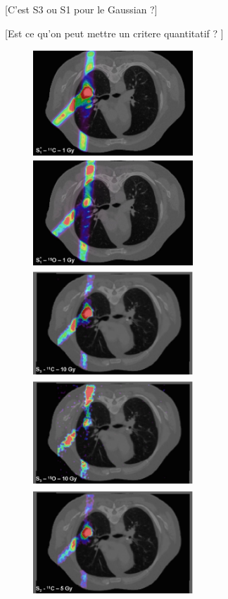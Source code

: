 \documentclass[11pt]{iopart}
\newcommand{\dsnote}[1]{{\color{green}[#1]}}
\begin{document}
\dsnote{C'est S3 ou S1 pour le Gaussian ?}

\dsnote{Est ce qu'on peut mettre un critere quantitatif ? }


\begin{figure}[!h]
  \centering
  \includegraphics[width=6cm,height=40mm]{figures/gaussPET_C11_v1.jpg}
  \includegraphics[width=6cm,height=40mm]{figures/gaussPET_O15_v1.jpg}
  \includegraphics[width=6cm,height=40mm]{figures/C11_10Gy_v1.jpg}
  \includegraphics[width=6cm,height=40mm]{figures/O15_10Gy_v1.jpg}
  \includegraphics[width=6cm,height=40mm]{figures/C11_5Gy_v1.jpg}

\end{figure}
\end{document}
